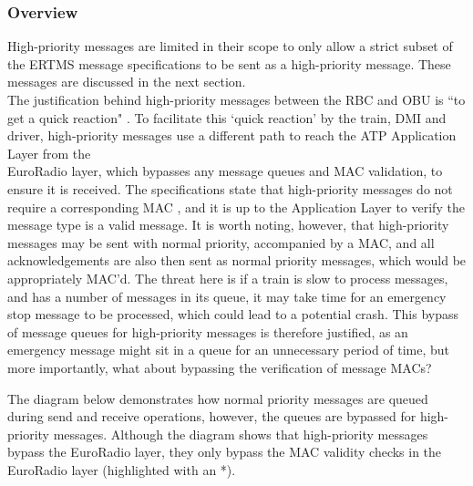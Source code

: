 \documentclass[twoside,11pt,a4paper]{article}
\begin{document}
\subsubsection{Overview}
High-priority messages are limited in their scope to only allow a strict subset of the ERTMS message specifications to be sent as a high-priority message. These messages are discussed in the next section.\\
The justification behind high-priority messages between the RBC and OBU is ``to get a quick reaction" \citep[Section 3.10.1.1.1]{SUBSET-026-3}. To facilitate this `quick reaction' by the train, DMI and driver, high-priority messages use a different path to reach the ATP Application Layer from the\\EuroRadio layer, which bypasses any message queues and MAC validation, to ensure it is received. The specifications state that high-priority messages do not require a corresponding MAC \citep[Section 7.1.7]{SUBSET-037}, and it is up to the Application Layer to verify the message type is a valid message. It is worth noting, however, that high-priority messages may be sent with normal priority, accompanied by a MAC, and all acknowledgements are also then sent as normal priority messages, which would be appropriately MAC'd. The threat here is if a train is slow to process messages, and has a number of messages in its queue, it may take time for an emergency stop message to be processed, which could lead to a potential crash. This bypass of message queues for high-priority messages is therefore justified, as an emergency message might sit in a queue for an unnecessary period of time, but more importantly, what about bypassing the verification of message MACs?

The diagram below demonstrates how normal priority messages are queued during send and receive operations, however, the queues are bypassed for high-priority messages. Although the diagram shows that high-priority messages bypass the EuroRadio layer, they only bypass the MAC validity checks in the EuroRadio layer (highlighted with an *).
\end{document}
